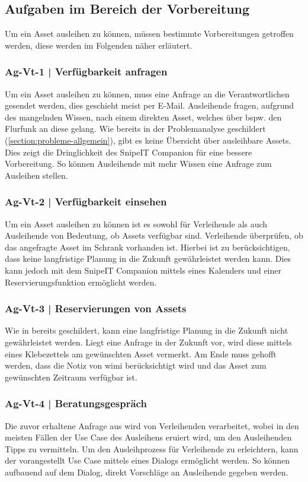 
\subsection{Aufgaben im Bereich der Vorbereitung}
Um ein Asset ausleihen zu können, müssen bestimmte Vorbereitungen getroffen werden, diese werden im
Folgenden näher erläutert.
\subsubsection{Ag-Vt-1 | Verfügbarkeit anfragen}
\label{subsubsection:Ag-Vt-1}
Um ein Asset ausleihen zu können, muss eine Anfrage an die Verantwortlichen gesendet werden, dies
geschieht meist per E-Mail. Ausleihende fragen, aufgrund des mangelnden Wissen, nach einem direkten
Asset, welches über bspw. den Flurfunk an diese gelang. Wie bereits in der Problemanalyse
geschildert (\ref{section:probleme-allgemein}), gibt es keine Übersicht über ausleihbare Assets.
Dies zeigt die Dringlichkeit des SnipeIT Companion für eine bessere Vorbereitung. So können
Ausleihende mit mehr Wissen eine Anfrage zum Ausleihen stellen. 
\subsubsection{Ag-Vt-2 | Verfügbarkeit einsehen}
\label{subsubsection:Ag-Vt-2}
Um ein Asset ausleihen zu können ist es sowohl für Verleihende als auch Ausleihende von Bedeutung,
ob Assets verfügbar sind. Verleihende überprüfen, ob das angefragte Asset im Schrank vorhanden ist.
Hierbei ist zu berücksichtigen, dass keine langfristige Planung in die Zukunft gewährleistet werden
kann. Dies kann jedoch mit dem SnipeIT Companion mittels eines Kalenders und einer
Reservierungsfunktion ermöglicht werden.
\subsubsection{Ag-Vt-3 | Reservierungen von Assets}
\label{subsubsection:Ag-Vt-3}
Wie in  bereits geschildert, kann eine langfristige Planung in die
Zukunft nicht gewährleistet werden. Liegt eine Anfrage in der Zukunft vor, wird diese mittels eines
Klebezettels am gewünschten Asset vermerkt. Am Ende muss gehofft werden, dass die Notiz von
\ac{wimi} berücksichtigt wird und das Asset zum gewünschten Zeitraum verfügbar ist.
\subsubsection{Ag-Vt-4 | Beratungsgespräch }
\label{subsubsection:Ag-Vt-4}
Die zuvor erhaltene Anfrage aus  wird von Verleihenden verarbeitet,
wobei in den meisten Fällen der Use Case des Ausleihens eruiert wird, um den Ausleihenden Tipps zu
vermitteln. Um den Ausleihprozess für Verleihende zu erleichtern, kann der vorangestellt Use Case
mittels eines Dialogs ermöglicht werden. So können aufbauend auf dem Dialog, direkt Vorschläge an
Ausleihende gegeben werden.


